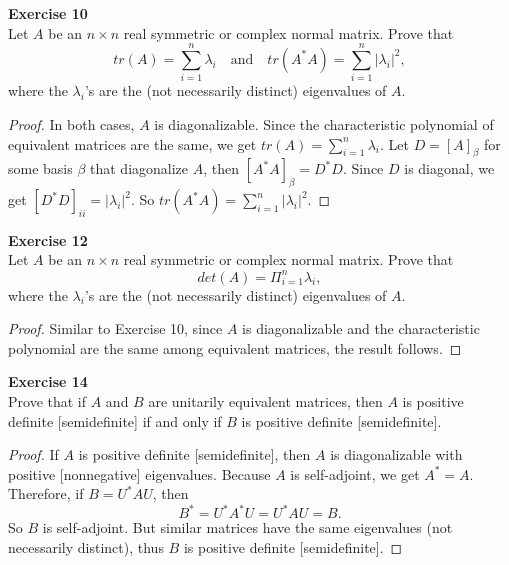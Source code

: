\documentclass[12pt, a4paper]{article}
\theoremstyle{plain}
\newenvironment{exercise}[2][Exercise]
    { \begin{mdframed}[backgroundcolor=gray!20] \textbf{#1 #2} \\}
    {  \end{mdframed}}
\begin{document}
\begin{exercise}{10}
Let $A$ be an $n\times n$ real symmetric or complex normal matrix. Prove that
\[
tr(A) = \sum_{i=1}^{n}{\lambda_i}\quad \text{and}\quad tr(A^*A)=\sum_{i=1}^{n}{|\lambda_i|^2},
\]
where the $\lambda_i$'s are the (not necessarily distinct) eigenvalues of $A$.
\end{exercise}
	\begin{proof}
	In both cases, $A$ is diagonalizable. Since the characteristic polynomial of equivalent matrices are the same, we get $tr(A) = \sum_{i=1}^{n}{\lambda_i}$. Let $D = [A]_\beta$ for some basis $\beta$ that diagonalize $A$, then $[A^*A]_\beta = D^*D$. Since $D$ is diagonal, we get $[D^*D]_{ii} = |\lambda_i|^2$. So $tr(A^*A) = \sum_{i=1}^{n}{|\lambda_i|^2}$.
	\end{proof}

\begin{exercise}{12}
Let $A$ be an $n\times n$ real symmetric or complex normal matrix. Prove that 
\[
det(A) = \Pi_{i=1}^n \lambda_i,
\]
where the $\lambda_i$'s are the (not necessarily distinct) eigenvalues of $A$.
\end{exercise}
	\begin{proof}
	Similar to Exercise 10, since $A$ is diagonalizable and the characteristic polynomial are the same among equivalent matrices, the result follows.
	\end{proof}

\begin{exercise}{14}
Prove that if $A$ and $B$ are unitarily equivalent matrices, then $A$ is positive definite [semidefinite] if and only if $B$ is positive definite [semidefinite].
\end{exercise}
	\begin{proof}
	If $A$ is positive definite [semidefinite], then $A$ is diagonalizable with positive [nonnegative] eigenvalues. Because $A$ is self-adjoint, we get $A^* = A$. Therefore, if $B=U^*AU$, then 
	\[
	B^* = U^*A^*U = U^*AU = B.
	\]
	So $B$ is self-adjoint. But similar matrices have the same eigenvalues (not necessarily distinct), thus $B$ is positive definite [semidefinite].
	\end{proof}

	
\pagebreak
\end{document}
